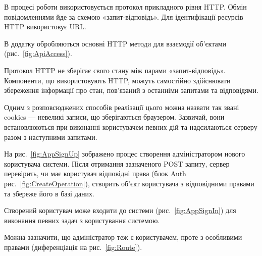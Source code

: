 В процесі роботи використовується протокол прикладного рівня HTTP. Обмін повідомленнями йде за схемою «запит-відповідь». Для ідентифікації ресурсів HTTP використовує URL. 

В додатку обробляються основні  HTTP методи для взаємодії об’єктами (рис.~\ref{fig:ApiAccess}). 

Протокол HTTP не зберігає свого стану між парами «запит-відповідь». Компоненти, що використовують HTTP, можуть самостійно здійснювати збереження інформації про стан, пов'язаний з останніми запитами та відповідями. 

Одним з розповсюджених способів реалізації цього можна назвати так звані cookies — невеликі записи, що зберігаються браузером. Зазвичай, вони встановлюються при виконанні користувачем певних дій та надсилаються серверу разом з наступними запитами. 

На рис.~\ref{fig:AppSignUp} зображено процес створення адміністратором нового користувача системи. Після отримання зазначеного POST запиту, сервер перевірить, чи має користувач відповідні права (блок Auth рис.~\ref{fig:CreateOperation}), створить об’єкт користувача з відповідними правами та збереже його в базі даних.


Створений користувач може входити до системи (рис.~\ref{fig:AppSignIn}) для виконання певних задач з користування системою.


Можна зазначити, що адміністратор теж є користувачем, проте з особливими правами (диференціація на рис.~\ref{fig:Route}).

